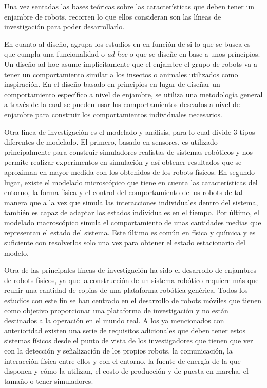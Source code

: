 Una vez sentadas las bases teóricas sobre las características que deben tener un enjambre de robots, \citeauthor{christian2008swarm} recorren lo que ellos consideran son las líneas de investigación para poder desarrollarlo. 

En cuanto al diseño, agrupa los estudios en en función de si lo que se busca es que cumpla una funcionalidad o \textit{ad-hoc} o que se diseñe en base a unos principios. Un diseño ad-hoc asume implícitamente que el enjambre el grupo de robots va a tener un comportamiento similar a los insectos o animales utilizados como inspiración. En el diseño basado en principios en lugar de diseñar un comportamiento específico a nivel de enjambre, se utiliza una metodología general a través de la cual se pueden usar los comportamientos deseados a nivel de enjambre para construir los comportamientos individuales necesarios.

Otra linea de investigación es el modelado y análisis, para lo cual divide 3 tipos diferentes de modelado. El primero, basado en sensores, es utilizado principalmente para construir simuladores realistas de sistemas robóticos y nos permite realizar experimentos en simulación y así obtener resultados que se aproximan en mayor medida con los obtenidos de los robots físicos. En segundo lugar, existe el modelado microscópico que tiene en cuenta las características del entorno, la forma física y el control del comportamiento de los robots de tal manera que a la vez que simula las interacciones individuales dentro del sistema, también es capaz de adaptar los estados individuales en el tiempo. Por último, el modelado macroscópico simula el comportamiento de unas cantidades medias que representan el estado del sistema. Este último es común en física y química y es suficiente con resolverlos solo una vez para obtener el estado estacionario del modelo.

Otra de las principales líneas de investigación ha sido el desarrollo de enjambres de robots físicos, ya que la construcción de un sistema robótico requiere más que reunir una cantidad de copias de una plataforma robótica genérica. Todos los estudios con este fin se han centrado en el desarrollo de robots móviles que tienen como objetivo proporcionar una plataforma de investigación y no están destinados a la operación en el mundo real. A los ya mencionados con anterioridad existen una serie de requisitos adicionales que deben tener estos sistemas físicos desde el punto de vista de los investigadores que tienen que ver con la detección y señalización de los propios robots, la comunicación, la interacción física entre ellos y con el entorno, la fuente de energía de la que disponen y cómo la utilizan, el costo de producción y de puesta en marcha, el tamaño o tener simuladores.

